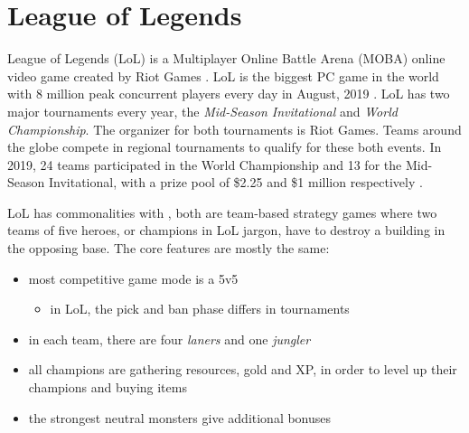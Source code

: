  \section[head={LoL}, tocentry={League of Legends}, reference={LoL}]{League of Legends} \label{sec:LoL}
League of Legends (LoL) is a Multiplayer Online Battle Arena (MOBA) online video game created by Riot Games \cite{NewToLea59:online}. LoL is the biggest PC game in the world with 8 million peak concurrent players every day in August, 2019 \cite{JoinUsOc5:online}. LoL has two major tournaments every year, the \textit{Mid-Season Invitational} and \textit{World Championship}. The organizer for both tournaments is Riot Games. Teams around the globe compete in regional tournaments to qualify for these both events. In 2019, 24 teams participated in the World Championship and 13 for the Mid-Season Invitational, with a prize pool of \$2.25 and \$1 million respectively \cite{PremierT40:online}.

LoL has commonalities with , both are team-based strategy games where two teams of five heroes, or champions in LoL jargon, have to destroy a building in the opposing base. The core features are mostly the same:
\begin{itemize}
	\item most competitive game mode is a 5v5
	\begin{itemize}
		\item in LoL, the pick and ban phase differs in tournaments \cite{NewToLea66:online}
	\end{itemize}
	\item in each team, there are four \textit{laners} and one \textit{jungler}
	\item all champions are gathering resources, gold and XP, in order to level up their champions and buying items
	\item the strongest neutral monsters give additional bonuses \cite{NewToLea79:online}
\end{itemize}

